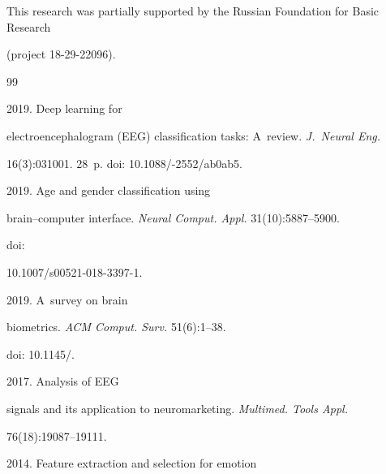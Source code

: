       This research was partially supported by the Russian Foundation for Basic Research 

(project 18-29-22096).








\renewcommand{\bibname}{\protect\rmfamily References}




{\small\frenchspacing

{%


\begin{thebibliography}{99}


 2019. Deep learning for 

electroencephalogram (EEG) classification tasks: A~review. \textit{J.~Neural Eng.} 

16(3):031001. 28~p. doi: 10.1088\!/-2552\!/\!ab0ab5.


 2019. Age and gender classification using 

 brain--computer interface. \textit{Neural Comput. Appl.} 31(10):5887--5900. 

 doi: 

10.1007\!/\!s00521-018-3397-1.


 2019. A~survey on brain 

biometrics. \textit{ACM Comput. Surv.} 51(6):1--38. 

doi: 10.1145\!/.


 2017. Analysis of EEG 

signals and its application to neuromarketing. \textit{Multimed. Tools Appl.} 

76(18):19087--19111.


 2014. Feature extraction and selection for emotion 


\end{thebibliography}}}
